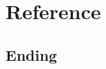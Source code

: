 \documentclass[aspectratio=169, compress]{beamer}
\begin{document}
%
%
%

	\section{Reference}
	\subsection{Ending}
	
\end{document}
